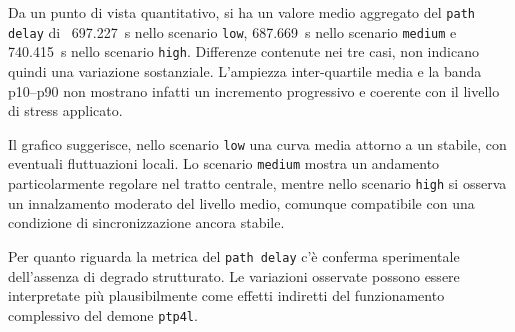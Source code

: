 Da un punto di vista quantitativo, si ha un valore medio aggregato del \texttt{path
delay} di ~697.227~\textmu s nello scenario \texttt{low}, 687.669~\textmu s nello
scenario \texttt{medium} e 740.415~\textmu s nello scenario \texttt{high}.
Differenze contenute nei tre casi, non indicano quindi una variazione sostanziale.
L'ampiezza inter-quartile media e la banda p10--p90 non mostrano infatti un incremento
progressivo e coerente con il livello di stress applicato.

Il grafico suggerisce, nello scenario \texttt{low} una curva media attorno a un stabile,
con eventuali fluttuazioni locali. Lo scenario \texttt{medium} mostra un
andamento particolarmente regolare nel tratto centrale, mentre nello scenario \texttt{high}
si osserva un innalzamento moderato del livello medio, comunque compatibile con una
condizione di sincronizzazione ancora stabile.

Per quanto riguarda la metrica del \texttt{path delay} c'è conferma sperimentale
dell'assenza di degrado strutturato. Le variazioni osservate possono essere interpretate
più plausibilmente come effetti indiretti del funzionamento complessivo del demone
\texttt{ptp4l}.

